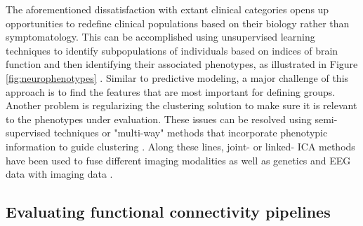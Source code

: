 \documentclass{bmcart}
\begin{document}
The aforementioned dissatisfaction with extant clinical categories opens up opportunities to redefine clinical populations based on their biology rather than symptomatology. This can be accomplished using unsupervised learning techniques to identify subpopulations of individuals based on indices of brain function and then identifying their associated phenotypes, as illustrated in Figure \ref{fig:neurophenotypes} \cite{Gates2014}. Similar to predictive modeling, a major challenge of this approach is to find the features that are most important for defining groups. Another problem is regularizing the clustering solution to make sure it is relevant to the phenotypes under evaluation. These issues can be resolved using semi-supervised techniques or "multi-way" methods that incorporate phenotypic information to guide clustering \cite{Morup2011}. Along these lines, joint- or linked- ICA methods have been used to fuse different imaging modalities \cite{Franco2008, Groves2011} as well as genetics and EEG data with imaging data \cite{Calhoun2009}. 

\subsection{Evaluating functional connectivity pipelines}
\end{document}
